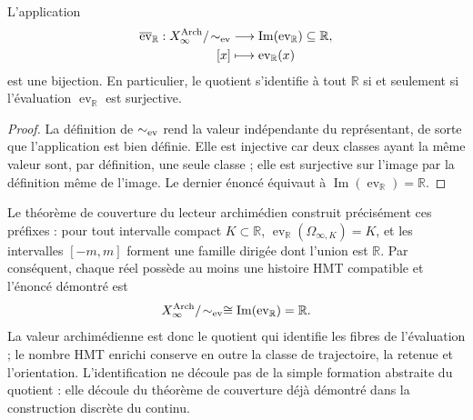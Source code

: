 \begin{theorem}
L'application
\[
\begin{aligned}
\overline{\operatorname{ev}}_{\mathbb R}:
X_\infty^{\rm Arch}/\!\sim_{\rm ev}
&\longrightarrow
\operatorname{Im}(\operatorname{ev}_{\mathbb R})\subseteq\mathbb R,\\
[x]&\longmapsto\operatorname{ev}_{\mathbb R}(x)
\end{aligned}
\]
est une bijection. En particulier, le quotient s'identifie à tout
\(\mathbb R\) si et seulement si l'évaluation
\(\operatorname{ev}_{\mathbb R}\) est surjective.
\end{theorem}

\begin{proof}
La définition de \(\sim_{\rm ev}\) rend la valeur indépendante du
représentant, de sorte que l'application est bien définie. Elle est injective car
deux classes ayant la même valeur sont, par définition, une seule classe ; elle est
surjective sur l'image par la définition même de l'image. Le dernier
énoncé équivaut à
\(\operatorname{Im}(\operatorname{ev}_{\mathbb R})=\mathbb R\).
\end{proof}

Le théorème de couverture du lecteur archimédien construit précisément ces
préfixes : pour tout intervalle compact \(K\subset\mathbb R\),
\(\operatorname{ev}_{\mathbb R}(\Omega_{\infty,K})=K\), et les intervalles
\([-m,m]\) forment une famille dirigée dont l'union est \(\mathbb R\). Par
conséquent, chaque réel possède au moins une histoire HMT compatible et
l'énoncé démontré est
\[
X_\infty^{\rm Arch}/\!\sim_{\rm ev}
\cong\operatorname{Im}(\operatorname{ev}_{\mathbb R})
=\mathbb R.
\]
La valeur archimédienne est donc le quotient qui identifie les fibres de
l'évaluation ; le nombre HMT enrichi conserve en outre la classe de
trajectoire, la retenue et l'orientation. L'identification ne découle pas de la
simple formation abstraite du quotient : elle découle du théorème de couverture déjà
démontré dans la construction discrète du continu.

